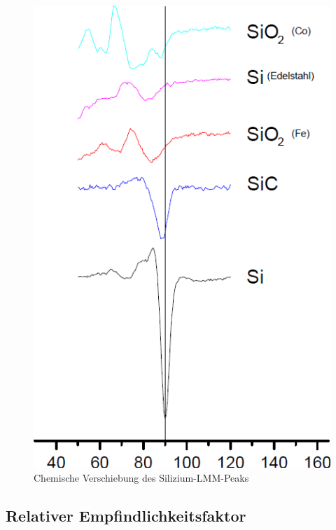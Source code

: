 	\begin{figure}[h]
		\centering
		\includegraphics[scale=0.4]{chem-shift.png}
		\caption{Chemische Verschiebung des Silizium-LMM-Peaks \cite{description}}
		\label{chemshift}
	\end{figure}



\subsection{Relativer Empfindlichkeitsfaktor} %
\label{sub:relativer_empfindlichkeitsfaktor}

